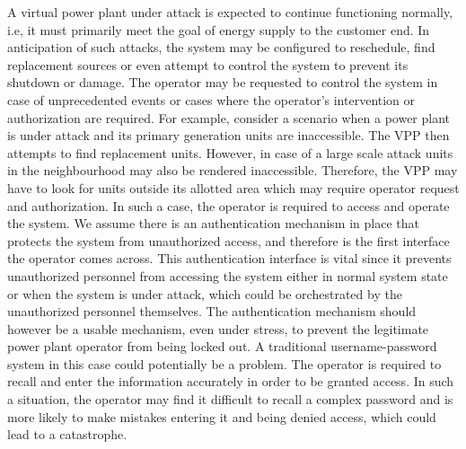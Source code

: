 A virtual power plant under attack is expected to continue functioning normally, i.e, it must primarily meet the goal of energy supply to the customer end. In anticipation of such attacks, the system may be configured to reschedule, find replacement sources or even attempt to control the system to prevent its shutdown or damage. The operator may be requested to control the system in case of unprecedented events or cases where the operator's intervention or authorization are required. For example, consider a scenario when a power plant is under attack and its primary generation units are inaccessible. The VPP then attempts to find replacement units. However, in case of a large scale attack units in the neighbourhood may also be rendered inaccessible. Therefore, the VPP may have to look for units outside its allotted area which may require operator request and authorization. In such a case, the operator is required to access and operate the system. We assume there is an authentication mechanism in place that protects the system from unauthorized access, and therefore is the first interface the operator comes across. This authentication interface is vital since it prevents unauthorized personnel from accessing the system either in normal system state or when the system is under attack, which could be orchestrated by the unauthorized personnel themselves. The authentication mechanism should however be a usable mechanism, even under stress, to prevent the legitimate power plant operator from being locked out. A traditional username-password system in this case could potentially be a problem. The operator is required to recall and enter the information accurately in order to be granted access. In such a situation, the operator may find it difficult to recall a complex password and is more likely to make mistakes entering it and being denied access, which could lead to a catastrophe. 

\smallskip

